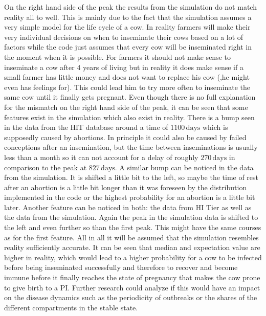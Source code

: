 On the right hand side of the peak the results from the simulation do not match reality all to well. This is mainly due to the fact that the simulation assumes a very simple model for the life cycle of a cow. In reality farmers will make their very individual decisions on when to inseminate their cows based on a lot of factors while the code just assumes that every cow will be inseminated right in the moment when it is possible. For farmers it should not make sense to inseminate a cow after 4 years of living but in reality it does make sense if a small farmer has little money and does not want to replace his cow (,he might even has feelings for). This could lead him to try more often to inseminate the same cow until it finally gets pregnant. 
Even though there is no full explanation for the mismatch on the right hand side of the peak, it can be seen that some features exist in the simulation which also exist in reality. There is a bump seen in the data from the HIT database around a time of $1100\,\text{days}$ which is supposedly caused by abortions. In principle it could also be caused by failed conceptions after an insemination, but the time between inseminations is usually less than a month so it can not account for a delay of roughly $270\,\text{days}$ in comparison to the peak at $827\,\text{days}$. 
A similar bump can be noticed in the data from the simulation. It is shifted a little bit to the left, so maybe the time of rest after an abortion is a little bit longer than it was foreseen by the distribution implemented in the code or the highest probability for an abortion is a little bit later. Another feature can be noticed in both: the data from HI Tier as well as the data from the simulation. Again the peak in the simulation data is shifted to the left and even further so than the first peak. This might have the same courses as for the first feature.
All in all it will be assumed that the simulation resembles reality sufficiently accurate. It can be seen that median and expectation value are higher in reality, which would lead to a higher probability for a cow to be infected before being inseminated successfully and therefore to recover and become immune before it finally reaches the state of pregnancy that makes the cow prone to give birth to a PI. Further research could analyze if this would have an impact on the disease dynamics such as the periodicity of outbreaks or the shares of the different compartments in the stable state. 
